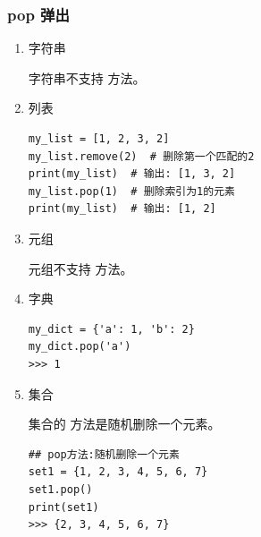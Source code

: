 \subsubsection{pop 弹出}
\begin{enumerate}[label=\arabic*)]
    \item 字符串

    字符串不支持  方法。

    \item 列表

\begin{lstlisting}[style=demostyle,numbers=none]
my_list = [1, 2, 3, 2]
my_list.remove(2)  # 删除第一个匹配的2
print(my_list)  # 输出: [1, 3, 2]
my_list.pop(1)  # 删除索引为1的元素
print(my_list)  # 输出: [1, 2]
\end{lstlisting}

    \item 元组

    元组不支持  方法。

    \item 字典

\begin{lstlisting}[style=demostyle,numbers=none]
my_dict = {'a': 1, 'b': 2}
my_dict.pop('a')
>>> 1
\end{lstlisting}

    \item 集合

    集合的  方法是随机删除一个元素。
\begin{lstlisting}[style=demostyle,numbers=none]
## pop方法:随机删除一个元素
set1 = {1, 2, 3, 4, 5, 6, 7}
set1.pop()
print(set1)
>>> {2, 3, 4, 5, 6, 7}
\end{lstlisting}
\end{enumerate}



